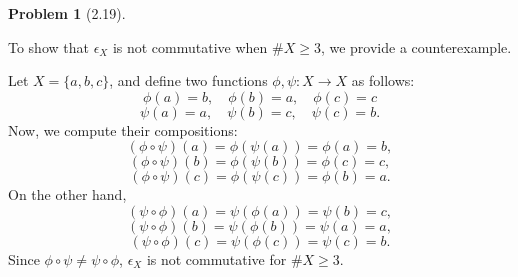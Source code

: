 \documentclass[12pt]{article}
\theoremstyle{definition}
\newtheorem{problem}{Problem}
\begin{document}
\begin{problem}[2.19]
\begin{enumerate}[label=(\alph*)]
        \begin{solution}
            To show that $\epsilon_X$ is not commutative when $\#X \geq 3$, we provide a counterexample.

            Let $X = \{a, b, c\}$, and define two functions $\phi, \psi : X \to X$ as follows:
            \[
            \phi(a) = b, \quad \phi(b) = a, \quad \phi(c) = c
            \]
            \[
            \psi(a) = a, \quad \psi(b) = c, \quad \psi(c) = b.
            \]
            Now, we compute their compositions:
            \[
            (\phi \circ \psi)(a) = \phi(\psi(a)) = \phi(a) = b, 
            \]
            \[
            (\phi \circ \psi)(b) = \phi(\psi(b)) = \phi(c) = c, 
            \]
            \[
            (\phi \circ \psi)(c) = \phi(\psi(c)) = \phi(b) = a.
            \]
            On the other hand,
            \[
            (\psi \circ \phi)(a) = \psi(\phi(a)) = \psi(b) = c, 
            \]
            \[
            (\psi \circ \phi)(b) = \psi(\phi(b)) = \psi(a) = a, 
            \]
            \[
            (\psi \circ \phi)(c) = \psi(\phi(c)) = \psi(c) = b.
            \]
            Since $\phi \circ \psi \neq \psi \circ \phi$, $\epsilon_X$ is not commutative for $\#X \geq 3$.
            
        \end{solution}
    \end{enumerate}
\end{problem}
\end{document}

